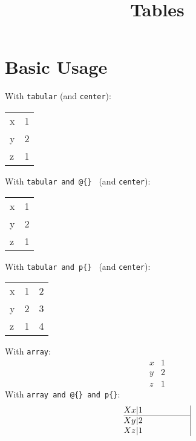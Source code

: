 \documentclass{ximera}
\title{Tables}
\begin{document}
\begin{abstract}
\end{abstract}
\maketitle

\section{Basic Usage}


        With \verb|tabular| (and \verb|center|):
        \begin{center}
            \begin{tabular}{lr}
                x & 1 \\
                y & 2 \\
                z & 1
            \end{tabular}
        \end{center}
        
        With \verb|tabular and @{} | (and \verb|center|):
        \begin{center}
            \begin{tabular}{@{}l@{ }r@{.}}
             x & 1 \\
             y & 2 \\
             z & 1
            \end{tabular}
            \end{center}

    With \verb|tabular and p{} | (and \verb|center|):
        \begin{center}
            \begin{tabular}{|p{1cm}|p{2cm}|p{3cm}|}
             x & 1 & 2\\
             y & 2 & 3\\
             z & 1 & 4
            \end{tabular}
        \end{center}

    With \verb|array|:
        $$
        \begin{array}{l|r}
         x & 1 \\
         \hline
         y & 2 \\
         z & 1
        \end{array}
        $$
    With \verb|array and @{} and p{}|:
        $$
        \begin{array}{@{X }l@{|}p{2cm}|}
         x & 1 \\
         \hline
         y & 2 \\
         z & 1
        \end{array}
        $$
\end{document}
